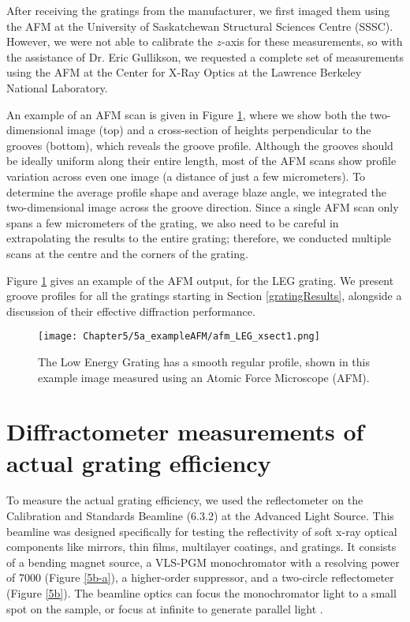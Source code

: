 After receiving the gratings from the manufacturer, we first imaged them using the AFM at the University of Saskatchewan Structural Sciences Centre (SSSC).  However, we were not able to calibrate the $z$-axis for these measurements, so with the assistance of Dr. Eric Gullikson, we requested a complete set of measurements using the AFM at the Center for X-Ray Optics at the Lawrence Berkeley National Laboratory.

An example of an AFM scan is given in Figure \ref{5a}, where we show both the two-dimensional image (top) and a cross-section of heights perpendicular to the grooves (bottom), which reveals the groove profile.  Although the grooves should be ideally uniform along their entire length, most of the AFM scans show profile variation across even one image (a distance of just a few micrometers).  To determine the average profile shape and average blaze angle, we integrated the two-dimensional image across the groove direction.  Since a single AFM scan only spans a few micrometers of the grating, we also need to be careful in extrapolating the results to the entire grating; therefore, we conducted multiple scans at the centre and the corners of the grating.

Figure \ref{5a} gives an example of the AFM output, for the LEG grating.  We present  groove profiles for all the gratings starting in Section \ref{gratingResults}, alongside a discussion of their effective diffraction performance.

\begin{figure}[htbp] %
   \centering
   \texttt{[image: Chapter5/5a\_exampleAFM/afm\_LEG\_xsect1.png]} 
   \caption{The Low Energy Grating has a smooth regular profile, shown in this example image measured using an Atomic Force Microscope (AFM).}
   \label{5a}
\end{figure}

\section{Diffractometer measurements of actual grating efficiency}
To measure the actual grating efficiency, we used the reflectometer on the Calibration and Standards Beamline (6.3.2) at the Advanced Light Source.  This beamline was designed specifically for testing the reflectivity of soft x-ray optical components like mirrors, thin films, multilayer coatings, and gratings.  It consists of a bending magnet source, a VLS-PGM monochromator with a resolving power of 7000 (Figure \ref{5b-a}), a higher-order suppressor, and a two-circle reflectometer (Figure \ref{5b}).  The beamline optics can focus the monochromator light to a small spot on the sample, or focus at infinite to generate parallel light \cite{Und96}.

